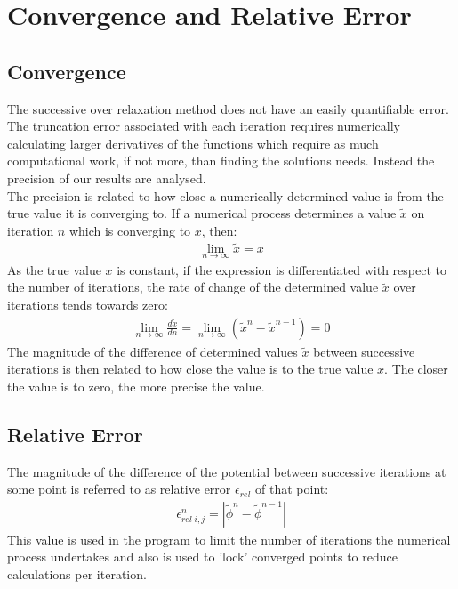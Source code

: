 \section{Convergence and Relative Error}
\subsection{Convergence}
The successive over relaxation method does not have an easily quantifiable error. The truncation error associated with each iteration requires numerically calculating larger derivatives of the functions which require as much computational work, if not more, than finding the solutions needs. Instead the precision of our results are analysed.
\\
The precision is related to how close a numerically determined value is from the true value it is converging to. If a numerical process determines a value $\tilde{x}$ on iteration $n$ which is converging to $x$, then:
\begin{align}
\lim_{n \rightarrow \infty}\tilde{x} = x                     
\end{align}
As the true value $x$ is constant, if the expression is differentiated with respect to the number of iterations, the rate of change of the determined value $\tilde{x}$ over iterations tends towards zero:
\begin{align}
\lim_{n \rightarrow \infty}\frac{d\tilde{x}}{dn} = \lim_{n \rightarrow \infty} (\tilde{x}^{n} - \tilde{x}^{n-1}) = 0                     
\end{align}
The magnitude of the difference of determined values $\tilde{x}$ between successive iterations is then related to how close the value is to the true value $x$. The closer the value is to zero, the more precise the value.
\subsection{Relative Error}
The magnitude of the difference of the potential between successive iterations at some point is referred to as relative error $\epsilon_{rel}$ of that point:
\begin{align}
\epsilon_{rel \; i,j}^{n} = |\tilde{\phi}^{n} - \tilde{\phi}^{n-1}|
\end{align}
This value is used in the program to limit the number of iterations the numerical process undertakes and also is used to 'lock' converged points to reduce calculations per iteration.
